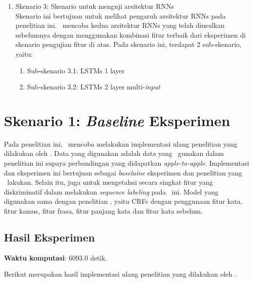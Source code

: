 \begin{enumerate}
	\item Skenario 3: Skenario untuk menguji arsitektur RNNs\\
	Skenario ini bertujuan untuk melihat pengaruh arsitektur RNNs pada penelitian ini. \Saya~mencoba kedua arsitektur RNNs yang telah diusulkan sebelumnya dengan menggunakan kombinasi fitur terbaik dari eksperimen di skenario pengujian fitur di atas. Pada skenario ini, terdapat 2 sub-skenario, yaitu:
	\begin{enumerate}
		\item Sub-skenario 3.1: LSTMs 1 layer
		\item Sub-skenario 3.2: LSTMs 2 layer multi-\textit{input}
	\end{enumerate}
	
\end{enumerate}

\section{Skenario 1: \textit{Baseline} Eksperimen \cite{skripsiKakRadit}}
Pada penelitian ini, \saya~mencoba melakukan implementasi ulang penelitian yang dilakukan oleh \cite{skripsiKakRadit}. Data yang digunakan adalah data yang \saya~gunakan dalam penelitian ini supaya perbandingan yang didapatkan \textit{apple-to-apple}. Implementasi dan eksperimen ini bertujuan sebagai \textit{baselaine} eksperimen dan penelitian yang \saya~lakukan. Selain itu, juga untuk mengetahui secara singkat fitur yang diskriminatif dalam melakukan \textit{sequence labeling} pada \mer~ini. Model yang digunakan sama dengan penelitian \cite{skripsiKakRadit}, yaitu CRFs dengan penggunaan fitur kata, fitur kamus, fitur frasa, fitur panjang kata dan fitur kata sebelum.

\subsection{Hasil Eksperimen}
\textbf{Waktu komputasi}: $ 6093.0 $ detik.

Berikut merupakan hasil implementasi ulang penelitian yang dilakukan oleh \cite{skripsiKakRadit}.
	
